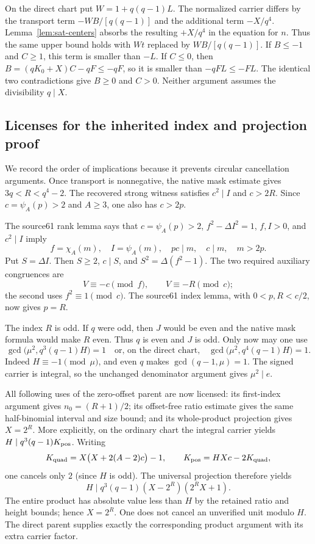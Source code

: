 On the direct chart put $W=1+q(q-1)L$.  The normalized carrier differs by the transport
term $-WB/[q(q-1)]$ and the additional term $-X/q^4$.
Lemma~\ref{lem:sat-centers} absorbs the resulting $+X/q^4$ in the
equation for $n$.  Thus the same upper bound holds with
$Wt$ replaced by $WB/[q(q-1)]$.  If $B\le-1$ and $C\ge1$,
this term is smaller than $-L$.  If $C\le0$, then
$B=(qK_0+X)C-qF\le-qF$, so it is smaller than
$-qFL\le-FL$.  The identical two contradictions give $B\ge0$
and $C>0$.  Neither argument assumes the divisibility $q\mid X$.

\subsection{Licenses for the inherited index and projection proof}

We record the order of implications because it prevents circular
cancellation arguments.  Once transport is nonnegative, the native
mask estimate gives $3q<R<q^4-2$.  The recovered strong witness
satisfies $c^2\mid I$ and $c>2R$.  Since $c=\psi_A(p)>2$ and
$A\ge3$, one also has $c>2p$.

The source61 rank lemma says that $c=\psi_A(p)>2$,
$f^2-\Delta I^2=1$, $f,I>0$, and $c^2\mid I$ imply
\[
 f=\chi_A(m),\quad I=\psi_A(m),\quad
 pc\mid m,\quad c\mid m,\quad m>2p.
\]
Put $S=\Delta I$.  Then $S\ge2$, $c\mid S$, and
$S^2=\Delta(f^2-1)$.  The two required auxiliary congruences are
\[
 V\equiv-c\pmod f,
 \qquad V\equiv-R\pmod c;
\]
the second uses $f^2\equiv1\pmod c$.  The source61 index lemma,
with $0<p,R<c/2$, now gives $p=R$.

The index $R$ is odd.  If $q$ were odd, then $J$ would be even and
the native mask formula would make $R$ even.  Thus $q$ is even
and $J$ is odd.  Only now may one use
\[
 \gcd\bigl(\mu^2,q^3(q-1)H\bigr)=1
 \quad\text{or, on the direct chart,}\quad
 \gcd\bigl(\mu^2,q^4(q-1)H\bigr)=1.
\]
Indeed $H\equiv-1\pmod\mu$, and even $q$ makes
$\gcd(q-1,\mu)=1$.  The signed carrier is integral, so the
unchanged denominator argument gives $\mu^2\mid e$.

All following uses of the zero-offset parent are now licensed:
its first-index argument gives $n_0=(R+1)/2$; its offset-free
ratio estimate gives the same half-binomial interval and size bound;
and its whole-product projection gives $X=2^R$.  More explicitly,
on the ordinary chart the integral carrier yields
$H\mid q^3(q-1)K_{\rm pos}$.  Writing
\[
 K_{\rm quad}=X\bigl(X+2(A-2)c\bigr)-1,
 \qquad K_{\rm pos}=HXc-2K_{\rm quad},
\]
one cancels only $2$ (since $H$ is odd).  The universal projection
therefore yields
\[
 H\mid q^3(q-1)(X-2^R)(2^RX+1).
\]
The entire product has absolute value less than $H$ by the retained
ratio and height bounds; hence $X=2^R$.  One does not cancel an
unverified unit modulo $H$.  The direct parent supplies exactly
the corresponding product argument with its extra carrier factor.

